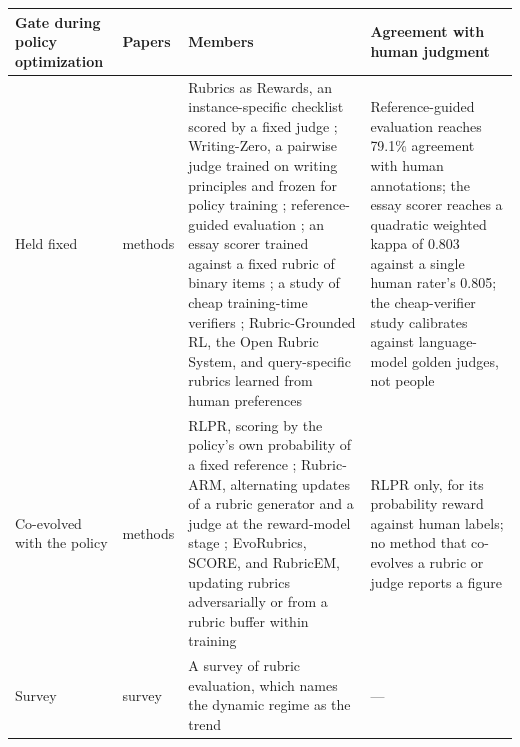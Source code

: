 \documentclass[
]{article}
\newcounter{none} %
\begin{document}
{\def\LTcaptype{none} %
\begin{longtable}[]{@{}
  >{\raggedright\arraybackslash}p{}
  >{\raggedright\arraybackslash}p{}
  >{\raggedright\arraybackslash}p{}
  >{\raggedright\arraybackslash}p{}@{}}
\toprule\noalign{}
\begin{minipage}[b]{\linewidth}\raggedright
Gate during policy optimization
\end{minipage} & \begin{minipage}[b]{\linewidth}\raggedright
Papers
\end{minipage} & \begin{minipage}[b]{\linewidth}\raggedright
Members
\end{minipage} & \begin{minipage}[b]{\linewidth}\raggedright
Agreement with human judgment
\end{minipage} \\
\midrule\noalign{}
\endhead
\bottomrule\noalign{}
\endlastfoot
Held fixed & 8 methods & Rubrics as Rewards, an instance-specific
checklist scored by a fixed judge \cite{gunjal2025rubrics};
Writing-Zero, a pairwise judge trained on writing principles and frozen
for policy training \cite{jia2025writingzero}; reference-guided
evaluation \cite{shi2026references}; an essay scorer trained against a
fixed rubric of binary items \cite{jin2026rlaes}; a study of cheap
training-time verifiers \cite{plesner2026cheapverifier};
Rubric-Grounded RL, the Open Rubric System, and query-specific rubrics
learned from human preferences
\cite{bhattarai2026rubricgrounded, jia2026openrubric, lv2026queryrubrics}
& Reference-guided evaluation reaches 79.1\% agreement with human
annotations; the essay scorer reaches a quadratic weighted kappa of
0.803 against a single human rater's 0.805; the cheap-verifier study
calibrates against language-model golden judges, not people \\
Co-evolved with the policy & 5 methods & RLPR, scoring by the policy's
own probability of a fixed reference \cite{yu2025rlpr}; Rubric-ARM,
alternating updates of a rubric generator and a judge at the
reward-model stage \cite{xu2026rubricarm}; EvoRubrics, SCORE, and
RubricEM, updating rubrics adversarially or from a rubric buffer within
training \cite{ding2026evorubrics, zhu2026score, li2026rubricem} & RLPR
only, for its probability reward against human labels; no method that
co-evolves a rubric or judge reports a figure \\
Survey & 1 survey & A survey of rubric evaluation, which names the
dynamic regime as the trend \cite{chen2026rubricsurvey} & --- \\
\end{longtable}
}
\end{document}

